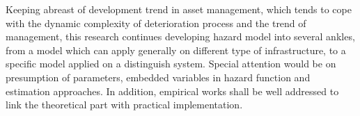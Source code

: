 Keeping abreast of development trend in asset management, which tends to cope with the dynamic complexity of deterioration process and the trend of management, this research continues developing hazard model into several ankles, from a model which can apply generally on different type of infrastructure, to a specific model applied on a distinguish system. Special attention would be on presumption of parameters, embedded variables in hazard function and estimation approaches. In addition, empirical works shall be well addressed to link the theoretical part with practical implementation.
%
%

